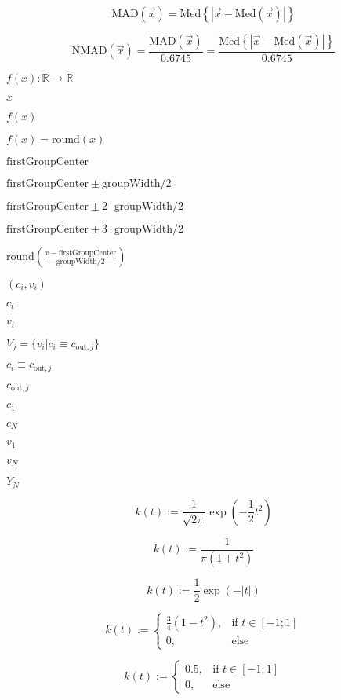 \documentclass{article}
\begin{document}
\[ \mbox{MAD}(\vec{x})=\mbox{Med}\left\{|\vec{x}-\mbox{Med}(\vec{x})|\right\} \]
\pagebreak

\[ \mbox{NMAD}(\vec{x})=\frac{\mbox{MAD}(\vec{x})}{0.6745}=\frac{\mbox{Med}\left\{|\vec{x}-\mbox{Med}(\vec{x})|\right\}}{0.6745} \]
\pagebreak

$ f(x): \mathbb{R}\rightarrow\mathbb{R} $
\pagebreak

$ x $
\pagebreak

$ f(x) $
\pagebreak

$ f(x)=\mbox{round}(x) $
\pagebreak

$ \mbox{firstGroupCenter} $
\pagebreak

$ \mbox{firstGroupCenter}\pm\mbox{groupWidth}/2$
\pagebreak

$ \mbox{firstGroupCenter}\pm2\cdot\mbox{groupWidth}/2 $
\pagebreak

$ \mbox{firstGroupCenter}\pm3\cdot\mbox{groupWidth}/2 $
\pagebreak

$ \mbox{round}\left(\frac{x-\mbox{firstGroupCenter}}{\mbox{groupWidth}/2}\right) $
\pagebreak

$ (c_i,v_i) $
\pagebreak

$ c_i $
\pagebreak

$ v_i $
\pagebreak

$ V_j=\{v_{i}|c_i\equiv c_{\text{out},j}\} $
\pagebreak

$ c_i\equiv c_{\text{out},j} $
\pagebreak

$ c_{\text{out},j} $
\pagebreak

$ c_1 $
\pagebreak

$ c_N $
\pagebreak

$ v_1 $
\pagebreak

$ v_N $
\pagebreak

$ Y_N $
\pagebreak

\[ k(t):=\frac{1}{\sqrt{2\pi}}\exp \left(-\frac{1}{2}t^2\right) \]
\pagebreak

\[ k(t):=\frac{1}{\pi(1+t^2)} \]
\pagebreak

\[ k(t):=\frac{1}{2}\exp(-|t|) \]
\pagebreak

\[ k(t) :=\begin{cases}\frac{3}{4} ( 1- t^2 ), & \text{if }t\in [-1;1]\\0, & \text{else}\end{cases} \]
\pagebreak

\[ k(t) :=\begin{cases}0.5, & \text{if }t\in [-1;1]\\0, & \text{else}\end{cases} \]
\pagebreak
\end{document}
